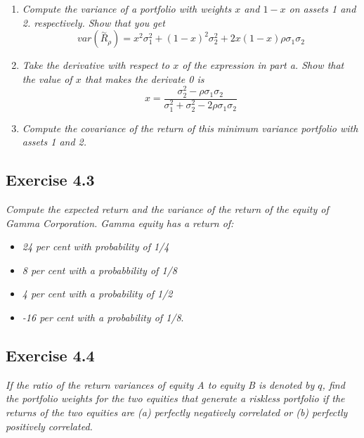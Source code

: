 \documentclass[]{book}
\theoremstyle{definition}
\theoremstyle{definition}
\theoremstyle{remark}
\begin{document}
\begin{enumerate}
\def\labelenumi{\alph{enumi}.}
\item
  \emph{Compute the variance of a portfolio with weights \(x\) and
  \(1 - x\) on assets 1 and 2. respectively. Show that you get}
  \citep[p.117]{book}
  \[var\left(\overset{\sim}{R}_\rho\right) = x^2\sigma^2_1 + \left(1-x\right)^2\sigma^2_2+2x\left(1-x\right)\rho\sigma_1\sigma_2\]
\item
  \emph{Take the derivative with respect to \(x\) of the expression in
  part a. Show that the value of \(x\) that makes the derivate 0 is}
  \citep[p.117]{book}
  \[x=\frac{\sigma^2_2-\rho\sigma_1\sigma_2}{\sigma_1^2+\sigma_2^2-2\rho\sigma_1\sigma_2}\]
\item
  \emph{Compute the covariance of the return of this minimum variance
  portfolio with assets 1 and 2.} \citep[p.117]{book}
\end{enumerate}

\subsection{Exercise 4.3}\label{exercise-4.3}

\emph{Compute the expected return and the variance of the return of the
equity of Gamma Corporation. Gamma equity has a return of:}
\citep[p.117]{book}

\begin{itemize}
\item
  \emph{24 per cent with probability of 1/4} \citep[p.117]{book}
\item
  \emph{8 per cent with a probabbility of 1/8} \citep[p.117]{book}
\item
  \emph{4 per cent with a probability of 1/2} \citep[p.117]{book}
\item
  \emph{-16 per cent with a probability of 1/8}. \citep[p.117]{book}
\end{itemize}

\subsection{Exercise 4.4}\label{exercise-4.4}

\emph{If the ratio of the return variances of equity A to equity B is
denoted by \(q\), find the portfolio weights for the two equities that
generate a riskless portfolio if the returns of the two equities are (a)
perfectly negatively correlated or (b) perfectly positively correlated.}
\citep[p.117]{book}
\end{document}
